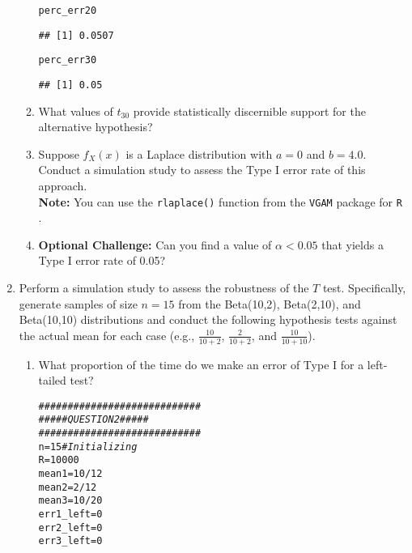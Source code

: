 \documentclass{article}\usepackage[]{graphicx}\usepackage[]{xcolor}
\makeatletter
\newcommand{\hlnum}[1]{\textcolor[rgb]{0.686,0.059,0.569}{#1}}%
\newcommand{\hlcom}[1]{\textcolor[rgb]{0.678,0.584,0.686}{\textit{#1}}}%
\newcommand{\hlopt}[1]{\textcolor[rgb]{0,0,0}{#1}}%
\newcommand{\hldef}[1]{\textcolor[rgb]{0.345,0.345,0.345}{#1}}%
\newcommand{\hlkwb}[1]{\textcolor[rgb]{0.69,0.353,0.396}{#1}}%
\newenvironment{kframe}{%
 \def\at@end@of@kframe{}%
 \ifinner\ifhmode%
  \def\at@end@of@kframe{\end{minipage}}%
  \begin{minipage}{\columnwidth}%
 \fi\fi%
 \def\FrameCommand##1{\hskip\@totalleftmargin \hskip-\fboxsep
 \colorbox{shadecolor}{##1}\hskip-\fboxsep
     \hskip-\linewidth \hskip-\@totalleftmargin \hskip\columnwidth}%
 \MakeFramed {\advance\hsize-\width
   \@totalleftmargin\z@ \linewidth\hsize
   \@setminipage}}%
 {\par\unskip\endMakeFramed%
 \at@end@of@kframe}
\newenvironment{knitrout}{}{} %
\makeatother
\begin{document}
\begin{enumerate}
\begin{enumerate}
\begin{knitrout}
\begin{kframe}
\begin{alltt}
\hldef{perc_err20}
\end{alltt}
\begin{verbatim}
## [1] 0.0507
\end{verbatim}
\begin{alltt}
\hldef{perc_err30}
\end{alltt}
\begin{verbatim}
## [1] 0.05
\end{verbatim}
\end{kframe}
\end{knitrout}
  \item What values of $t_{30}$ provide statistically discernible support for the
  alternative hypothesis?
  \item Suppose $f_X(x)$ is a Laplace distribution with $a=0$ and $b=4.0$.
  Conduct a simulation study to assess the Type I error rate of this approach.\\
  \textbf{Note:} You can use the \texttt{rlaplace()} function from the \texttt{VGAM}
  package for \texttt{R} \citep{VGAM}.
  \item \textbf{Optional Challenge:} Can you find a value of $\alpha<0.05$ that yields a 
  Type I error rate of 0.05?
\end{enumerate}
  \item Perform a simulation study to assess the robustness of the $T$ test. 
  Specifically, generate samples of size $n=15$ from the Beta(10,2), Beta(2,10), 
  and Beta(10,10) distributions and conduct the following hypothesis tests against 
  the actual mean for each case (e.g., $\frac{10}{10+2}$, $\frac{2}{10+2}$, and 
  $\frac{10}{10+10}$). 
  \begin{enumerate}
    \item What proportion of the time do we make an error of Type I for a
    left-tailed test?
\begin{knitrout}\scriptsize
{}\color{fgcolor}\begin{kframe}
\begin{alltt}
\hlcom{############################}
\hlcom{#####    QUESTION 2    #####}
\hlcom{############################}
\hldef{n}\hlkwb{=}\hlnum{15} \hlcom{#Initializing}
\hldef{R}\hlkwb{=}\hlnum{10000}
\hldef{mean1} \hlkwb{=} \hlnum{10}\hlopt{/}\hlnum{12}
\hldef{mean2} \hlkwb{=} \hlnum{2}\hlopt{/}\hlnum{12}
\hldef{mean3} \hlkwb{=} \hlnum{10}\hlopt{/}\hlnum{20}
\hldef{err1_left}\hlkwb{=}\hlnum{0}
\hldef{err2_left}\hlkwb{=}\hlnum{0}
\hldef{err3_left}\hlkwb{=}\hlnum{0}


\end{alltt}
\end{kframe}
\end{knitrout}
\end{enumerate}
\end{enumerate}
\end{document}
